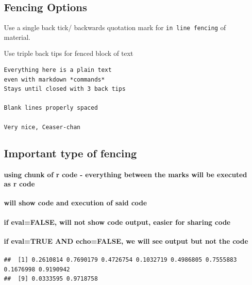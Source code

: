 \documentclass[
]{article}
\begin{document}
\subsection{Fencing Options}\label{fencing-options}

Use a single back tick/ backwards quotation mark for
\texttt{in\ line\ fencing} of material.

Use triple back tips for fenced block of text

\begin{verbatim}
Everything here is a plain text
even with markdown *commands*
Stays until closed with 3 back tips

Blank lines properly spaced

Very nice, Ceaser-chan
\end{verbatim}

\subsection{Important type of fencing}\label{important-type-of-fencing}

\paragraph{using chunk of r code - everything between the marks will be
executed as r
code}\label{using-chunk-of-r-code---everything-between-the-marks-will-be-executed-as-r-code}

\paragraph{will show code and execution of said
code}\label{will-show-code-and-execution-of-said-code}

\paragraph{if eval=FALSE, will not show code output, easier for sharing
code}\label{if-evalfalse-will-not-show-code-output-easier-for-sharing-code}

\paragraph{if eval=TRUE AND echo=FALSE, we will see output but not the
code}\label{if-evaltrue-and-echofalse-we-will-see-output-but-not-the-code}

\begin{verbatim}
##  [1] 0.2610814 0.7690179 0.4726754 0.1032719 0.4986805 0.7555883 0.1676998 0.9190942
##  [9] 0.0333595 0.9718758
\end{verbatim}
\end{document}
